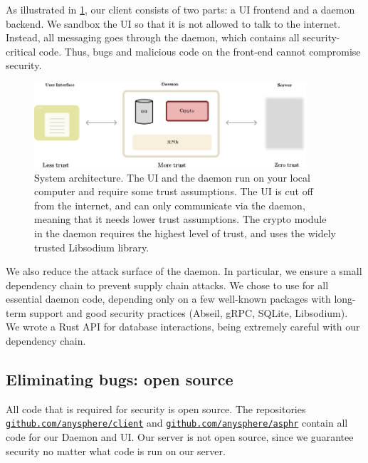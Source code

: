 As illustrated in \cref{fig:systemdiagram}, our client consists of two parts: a UI frontend and a daemon backend. We sandbox the UI so that it is not allowed to talk to the internet. Instead, all messaging goes through the daemon, which contains all security-critical code. Thus, bugs and malicious code on the front-end cannot compromise security.
\begin{figure}
    \centering
    \includegraphics[width=0.9\textwidth]{systemdiagram.pdf}
\caption{System architecture. The UI and the daemon run on your local computer and require some trust assumptions. The UI is cut off from the internet, and can only communicate via the daemon, meaning that it needs lower trust assumptions. The crypto module in the daemon requires the highest level of trust, and uses the widely trusted Libsodium library.}
\label{fig:systemdiagram}
\end{figure}

We also reduce the attack surface of the daemon. In particular, we ensure a small dependency chain to prevent supply chain attacks. We chose to use \Cpp for all essential daemon code, depending only on a few well-known packages with long-term support and good security practices (Abseil, gRPC, SQLite, Libsodium). We wrote a Rust API for database interactions, being extremely careful with our dependency chain. 


\subsection{Eliminating bugs: open source}

All code that is required for security is open source. The repositories \\ {\tt \href{https://github.com/anysphere/client}{github.com/anysphere/client}} and  {\tt \href{https://github.com/anysphere/asphr}{github.com/anysphere/asphr}} contain all code for our Daemon and UI. Our server is not open source, since we guarantee security no matter what code is run on our server. 

